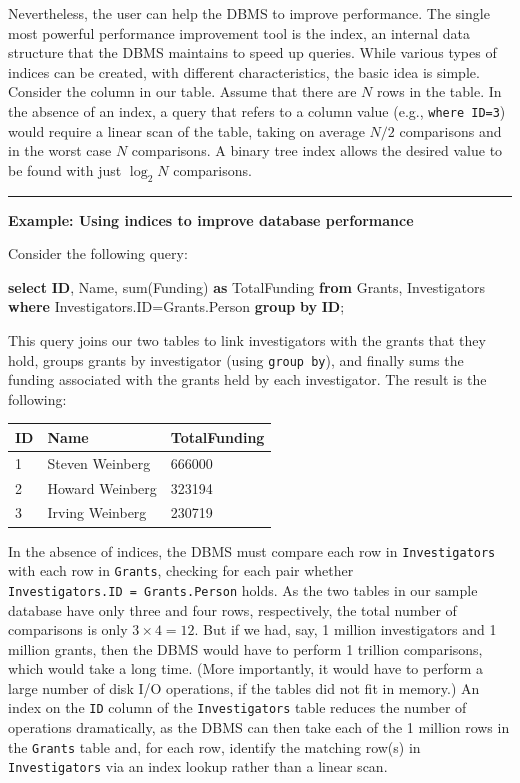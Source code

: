 \documentclass[]{krantz}
\newenvironment{Shaded}{\begin{snugshade}}{\end{snugshade}}
\newcommand{\KeywordTok}[1]{\textcolor[rgb]{0.13,0.29,0.53}{\textbf{#1}}}
\newcommand{\FunctionTok}[1]{\textcolor[rgb]{0.00,0.00,0.00}{#1}}
\newcommand{\NormalTok}[1]{#1}
\begin{document}
Nevertheless, the user can help the DBMS to improve performance. The
single most powerful performance improvement tool is the index, an
internal data structure that the DBMS maintains to speed up queries.
While various types of indices can be created, with different
characteristics, the basic idea is simple. Consider the column in our
table. Assume that there are \(N\) rows in the table. In the absence of
an index, a query that refers to a column value (e.g.,
\texttt{where\ ID=3}) would require a linear scan of the table, taking
on average \(N/2\) comparisons and in the worst case \(N\) comparisons.
A binary tree index allows the desired value to be found with just
\(\log_2 N\) comparisons.

\begin{center}\rule{0.5\linewidth}{\linethickness}\end{center}

\textbf{Example: Using indices to improve database performance}

Consider the following query:

\begin{Shaded}
\begin{Highlighting}[]
\KeywordTok{select} \KeywordTok{ID}\NormalTok{, Name, }\FunctionTok{sum}\NormalTok{(Funding) }\KeywordTok{as}\NormalTok{ TotalFunding}
  \KeywordTok{from}\NormalTok{ Grants, Investigators}
    \KeywordTok{where}\NormalTok{ Investigators.ID=Grants.Person}
  \KeywordTok{group} \KeywordTok{by} \KeywordTok{ID}\NormalTok{;}
\end{Highlighting}
\end{Shaded}

This query joins our two tables to link investigators with the grants
that they hold, groups grants by investigator (using
\texttt{group\ by}), and finally sums the funding associated with the
grants held by each investigator. The result is the following:

\begin{longtable}[]{@{}lll@{}}
\toprule
\textbf{ID} & \textbf{Name} & \textbf{TotalFunding}\tabularnewline
\midrule
\endhead
1 & Steven Weinberg & 666000\tabularnewline
2 & Howard Weinberg & 323194\tabularnewline
3 & Irving Weinberg & 230719\tabularnewline
\bottomrule
\end{longtable}

In the absence of indices, the DBMS must compare each row in
\texttt{Investigators} with each row in \texttt{Grants}, checking for
each pair whether \texttt{Investigators.ID\ =\ Grants.Person} holds. As
the two tables in our sample database have only three and four rows,
respectively, the total number of comparisons is only \(3\times 4=12\).
But if we had, say, 1 million investigators and 1 million grants, then
the DBMS would have to perform 1 trillion comparisons, which would take
a long time. (More importantly, it would have to perform a large number
of disk I/O operations, if the tables did not fit in memory.) An index
on the \texttt{ID} column of the \texttt{Investigators} table reduces
the number of operations dramatically, as the DBMS can then take each of
the 1 million rows in the \texttt{Grants} table and, for each row,
identify the matching row(s) in \texttt{Investigators} via an index
lookup rather than a linear scan.
\end{document}
